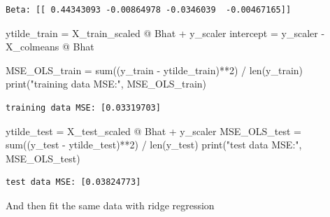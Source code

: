 \documentclass[
  letterpaper,
  DIV=11,
  numbers=noendperiod]{scrartcl}
\newenvironment{Shaded}{\begin{snugshade}}{\end{snugshade}}
\newcommand{\BuiltInTok}[1]{\textcolor[rgb]{0.00,0.23,0.31}{#1}}
\newcommand{\DecValTok}[1]{\textcolor[rgb]{0.68,0.00,0.00}{#1}}
\newcommand{\NormalTok}[1]{\textcolor[rgb]{0.00,0.23,0.31}{#1}}
\newcommand{\OperatorTok}[1]{\textcolor[rgb]{0.37,0.37,0.37}{#1}}
\newcommand{\StringTok}[1]{\textcolor[rgb]{0.13,0.47,0.30}{#1}}
\begin{document}
\begin{verbatim}
Beta: [[ 0.44343093 -0.00864978 -0.0346039  -0.00467165]]
\end{verbatim}

\begin{Shaded}
\begin{Highlighting}[]
\NormalTok{ytilde\_train }\OperatorTok{=}\NormalTok{ X\_train\_scaled }\OperatorTok{@}\NormalTok{ Bhat }\OperatorTok{+}\NormalTok{ y\_scaler}
\NormalTok{intercept }\OperatorTok{=}\NormalTok{ y\_scaler }\OperatorTok{{-}}\NormalTok{ X\_colmeans }\OperatorTok{@}\NormalTok{ Bhat}

\NormalTok{MSE\_OLS\_train }\OperatorTok{=} \BuiltInTok{sum}\NormalTok{((y\_train }\OperatorTok{{-}}\NormalTok{ ytilde\_train)}\OperatorTok{**}\DecValTok{2}\NormalTok{) }\OperatorTok{/} \BuiltInTok{len}\NormalTok{(y\_train)}
\BuiltInTok{print}\NormalTok{(}\StringTok{"training data MSE:"}\NormalTok{, MSE\_OLS\_train)}
\end{Highlighting}
\end{Shaded}

\begin{verbatim}
training data MSE: [0.03319703]
\end{verbatim}

\begin{Shaded}
\begin{Highlighting}[]
\NormalTok{ytilde\_test }\OperatorTok{=}\NormalTok{ X\_test\_scaled }\OperatorTok{@}\NormalTok{ Bhat }\OperatorTok{+}\NormalTok{ y\_scaler }
\NormalTok{MSE\_OLS\_test }\OperatorTok{=} \BuiltInTok{sum}\NormalTok{((y\_test }\OperatorTok{{-}}\NormalTok{ ytilde\_test)}\OperatorTok{**}\DecValTok{2}\NormalTok{) }\OperatorTok{/} \BuiltInTok{len}\NormalTok{(y\_test)}
\BuiltInTok{print}\NormalTok{(}\StringTok{"test data MSE:"}\NormalTok{, MSE\_OLS\_test)}
\end{Highlighting}
\end{Shaded}

\begin{verbatim}
test data MSE: [0.03824773]
\end{verbatim}

And then fit the same data with ridge regression
\end{document}
